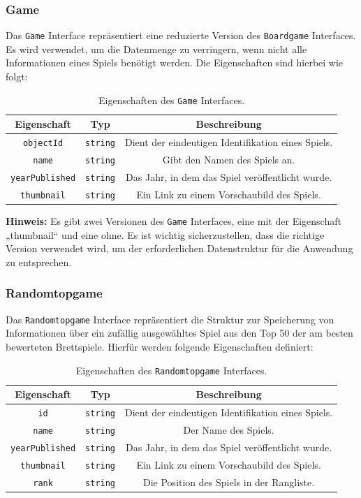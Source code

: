 \subsubsection{Game}
Das \texttt{Game} Interface repräsentiert eine reduzierte Version des \texttt{Boardgame} Interfaces. Es
wird verwendet, um die Datenmenge zu verringern, wenn nicht alle Informationen eines Spiels
benötigt werden. Die Eigenschaften sind hierbei wie folgt:
\begin{table}[H]
    \centering
    \begin{tabular}{|c|c|c|}
        \hline
        \textbf{Eigenschaft} & \textbf{Typ} & \textbf{Beschreibung} \\
        \hline
        \texttt{objectId} & \texttt{string} & Dient der eindeutigen Identifikation eines Spiels. \\
        \texttt{name} & \texttt{string} & Gibt den Namen des Spiels an. \\
        \texttt{yearPublished} & \texttt{string} & Das Jahr, in dem das Spiel veröffentlicht wurde. \\
        \texttt{thumbnail} & \texttt{string} & Ein Link zu einem Vorschaubild des Spiels. \\
        \hline
    \end{tabular}
    \caption{Eigenschaften des \texttt{Game} Interfaces.}
    \label{tab:game}
\end{table}
\textbf{Hinweis:} Es gibt zwei Versionen des \texttt{Game} Interfaces, eine mit der Eigenschaft „thumbnail“ und eine
ohne. Es ist wichtig sicherzustellen, dass die richtige Version verwendet wird, um der erforderlichen
Datenstruktur für die Anwendung zu entsprechen.

\subsubsection{Randomtopgame}
Das \texttt{Randomtopgame} Interface repräsentiert die Struktur zur Speicherung von Informationen über ein
zufällig ausgewähltes Spiel aus den Top 50 der am besten bewerteten Brettspiele. Hierfür werden folgende
Eigenschaften definiert:
\begin{table}[H]
    \centering
    \begin{tabular}{|c|c|c|}
        \hline
        \textbf{Eigenschaft} & \textbf{Typ} & \textbf{Beschreibung} \\
        \hline
        \texttt{id} & \texttt{string} & Dient der eindeutigen Identifikation eines Spiels. \\
        \texttt{name} & \texttt{string} & Der Name des Spiels. \\
        \texttt{yearPublished} & \texttt{string} & Das Jahr, in dem das Spiel veröffentlicht wurde. \\
        \texttt{thumbnail} & \texttt{string} & Ein Link zu einem Vorschaubild des Spiels. \\
        \texttt{rank} & \texttt{string} & Die Position des Spiels in der Rangliste. \\
        \hline
    \end{tabular}
    \caption{Eigenschaften des \texttt{Randomtopgame} Interfaces.}
    \label{tab:randomtopgame}
\end{table}
